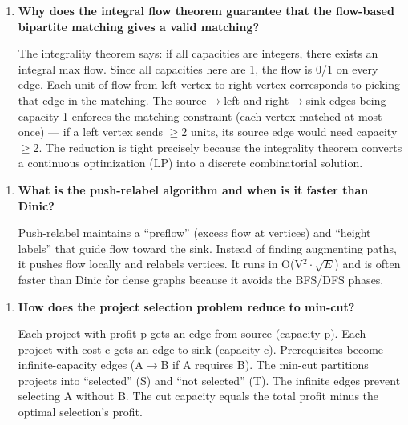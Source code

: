 \begin{enumerate}
\item \textbf{Why does the integral flow theorem guarantee that the flow-based bipartite matching gives a valid matching?}\label{faq:bipartite-integrality}

The integrality theorem says: if all capacities are integers, there exists an integral max flow. Since all capacities here are 1, the flow is 0/1 on every edge. Each unit of flow from left-vertex to right-vertex corresponds to picking that edge in the matching. The source$\to$left and right$\to$sink edges being capacity 1 enforces the matching constraint (each vertex matched at most once) — if a left vertex sends $\geq$2 units, its source edge would need capacity $\geq$2. The reduction is tight precisely because the integrality theorem converts a continuous optimization (LP) into a discrete combinatorial solution.
\end{enumerate}

\begin{enumerate}
\item \textbf{What is the push-relabel algorithm and when is it faster than Dinic?}

Push-relabel maintains a ``preflow'' (excess flow at vertices) and ``height labels'' that guide flow toward the sink. Instead of finding augmenting paths, it pushes flow locally and relabels vertices. It runs in O(V$^{2} \cdot \sqrt{E}$) and is often faster than Dinic for dense graphs because it avoids the BFS/DFS phases.
\end{enumerate}

\begin{enumerate}
\item \textbf{How does the project selection problem reduce to min-cut?}

Each project with profit p gets an edge from source (capacity p). Each project with cost c gets an edge to sink (capacity c). Prerequisites become infinite-capacity edges (A$\to$B if A requires B). The min-cut partitions projects into ``selected'' (S) and ``not selected'' (T). The infinite edges prevent selecting A without B. The cut capacity equals the total profit minus the optimal selection's profit.
\end{enumerate}

